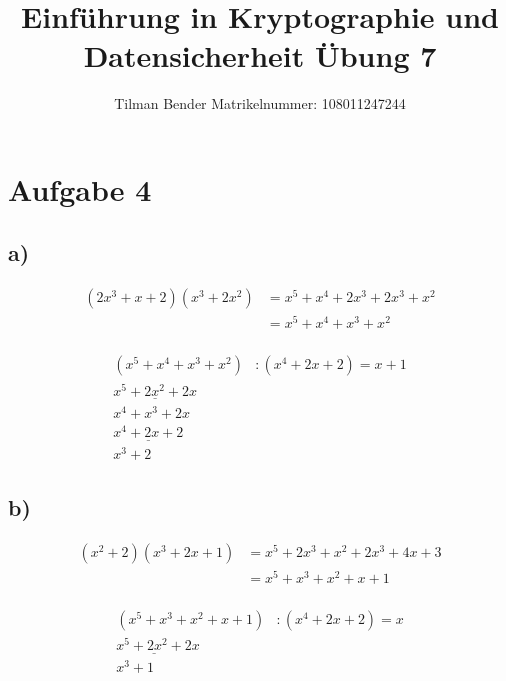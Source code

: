 \documentclass[10pt,a4paper]{article}
\author{Tilman Bender   Matrikelnummer: 108011247244\\}
\title{Einführung in Kryptographie und Datensicherheit Übung 7}
\begin{document}
\maketitle

\section*{Aufgabe 4}
\subsection*{a)}
\begin{align*}
(2x^{3}+x+2)(x^{3}+2x^{2})&=x^{5}+x^{4}+2x^{3}+2x^{3}+x^{2}\\
					 &=x^{5}+x^{4}+x^{3}+x^{2}\\
\end{align*}

\begin{align*}
(x^{5}+x^{4}+x^{3}+x^{2})&:(x^{4}+2x+2)=x+1\\
\underline{x^5+2x^{2}+2x}&\\
x^{4}+x^{3}+2x&\\
\underline{x^{4}+2x+2}&\\
x^{3}+2
\end{align*}

\subsection*{b)}
\begin{align*}
(x^{2}+2)(x^{3}+2x+1)&=x^{5}+2x^{3}+x^{2}+2x^{3}+4x+3\\
				&=x^{5}+x^{3}+x^{2}+x+1\\
\end{align*}

\begin{align*}
(x^{5}+x^{3}+x^{2}+x+1)&:(x^{4}+2x+2)=x\\
\underline{x^{5}+2x^{2}+2}x&\\
x^{3}+1
\end{align*}				
\end{document}
